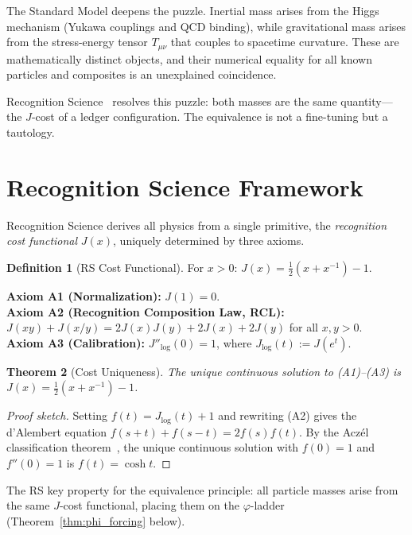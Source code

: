 \documentclass[12pt,a4paper]{article}
\newtheorem{theorem}{Theorem}[section]
\theoremstyle{definition}
\newtheorem{definition}[theorem]{Definition}
\theoremstyle{remark}
\begin{document}
The Standard Model deepens the puzzle.  Inertial mass arises
from the Higgs mechanism (Yukawa couplings and QCD binding),
while gravitational mass arises from the stress-energy tensor
$T_{\mu\nu}$ that couples to spacetime curvature.  These are
mathematically distinct objects, and their numerical equality
for all known particles and composites is an unexplained
coincidence.

Recognition Science~\cite{RS_Axioms} resolves this puzzle: both
masses are the same quantity---the $J$-cost of a ledger
configuration.  The equivalence is not a fine-tuning but a tautology.

\section{Recognition Science Framework}
\label{sec:framework}

Recognition Science derives all physics from a single primitive,
the \emph{recognition cost functional} $J(x)$, uniquely determined
by three axioms.

\begin{definition}[RS Cost Functional]
For $x > 0$: $J(x) = \tfrac{1}{2}(x + x^{-1}) - 1$.
\end{definition}

\noindent\textbf{Axiom A1 (Normalization):} $J(1) = 0$.\\
\textbf{Axiom A2 (Recognition Composition Law, RCL):}
$J(xy) + J(x/y) = 2J(x)J(y) + 2J(x) + 2J(y)$ for all $x, y > 0$.\\
\textbf{Axiom A3 (Calibration):} $J''_{\log}(0) = 1$, where
$J_{\log}(t) := J(e^t)$.

\begin{theorem}[Cost Uniqueness]
\label{thm:unique}
The unique continuous solution to \textup{(A1)--(A3)} is
$J(x) = \tfrac{1}{2}(x + x^{-1}) - 1$.
\end{theorem}

\begin{proof}[Proof sketch]
Setting $f(t) = J_{\log}(t) + 1$ and rewriting \textup{(A2)} gives the
d'Alembert equation $f(s+t) + f(s-t) = 2f(s)f(t)$.  By the Acz\'el
classification theorem~\cite{Aczel1966}, the unique continuous solution
with $f(0) = 1$ and $f''(0) = 1$ is $f(t) = \cosh t$.
\end{proof}

\noindent The RS key property for the equivalence principle: all particle
masses arise from the same $J$-cost functional, placing them on the
$\varphi$-ladder (Theorem~\ref{thm:phi_forcing} below).
\end{document}
